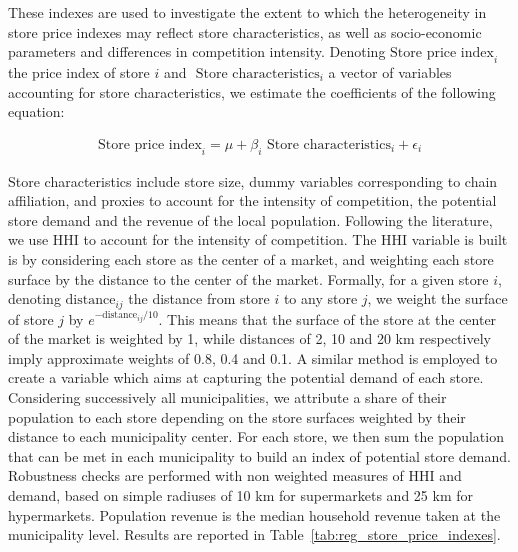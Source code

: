 \documentclass[english]{article}
\begin{document}
These indexes are used to investigate the extent to which the heterogeneity in store price indexes may reflect store characteristics, as well as socio-economic parameters and differences in competition intensity. Denoting $\text{Store price index}_{i}$ the price index of store $i$ and $\text{ Store characteristics}_i$ a vector of variables accounting for store characteristics, we estimate the coefficients of the following equation:

\begin{align}
\text{Store price index}_{i} = \mu + \beta_i \text{ Store characteristics}_i + \epsilon_{i}
\label{reg_store_indexes}
\end{align}

Store characteristics include store size, dummy variables corresponding to chain affiliation, and proxies to account for the intensity of competition, the potential store demand and the revenue of the local population. Following the literature, we use HHI to account for the intensity of competition. The HHI variable is built is by considering each store as the center of a market, and weighting each store surface by the distance to the center of the market. Formally, for a given store $i$, denoting $\text{distance}_{ij}$ the distance from store $i$ to any store $j$, we weight the surface of store $j$ by $e^{-\text{distance}_{ij}/10}$. This means that the surface of the store at the center of the market is weighted by 1, while distances of 2, 10 and 20 km respectively imply approximate weights of 0.8, 0.4 and 0.1. A similar method is employed to create a variable which aims at capturing the potential demand of each store. Considering successively all municipalities, we attribute a share of their population to each store depending on the store surfaces weighted by their distance to each municipality center. For each store, we then sum the population that can be met in each municipality to build an index of potential store demand. Robustness checks are performed with non weighted measures of HHI and demand, based on simple radiuses of 10 km for supermarkets and 25 km for hypermarkets. Population revenue is the median household revenue taken at the municipality level. Results are reported in Table~\ref{tab:reg_store_price_indexes}.
\end{document}
